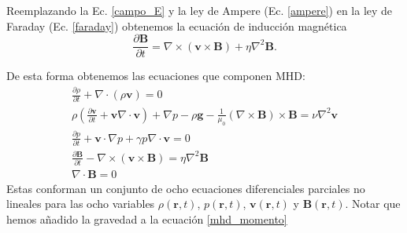\documentclass[a4paper,11pt]{report}
\begin{document}
Reemplazando la Ec. \ref{campo_E} y la ley de Ampere (Ec. \ref{ampere}) en la ley de Faraday (Ec. \ref{faraday}) obtenemos la ecuación de inducción magnética
\begin{equation}
\frac{\partial \boldsymbol{B}}{\partial t} = \nabla \times (\boldsymbol{v} \times \boldsymbol{B}) + \eta \nabla^2 \boldsymbol{B}. \label{induccion}
\end{equation}



De esta forma obtenemos las ecuaciones que componen MHD:
\begin{eqnarray}
\frac{\partial \rho}{\partial t} +\nabla \cdot (\rho \boldsymbol{v}) = 0 \label{conserv_densidad} \\
\rho \left( \frac{\partial\boldsymbol{v}}{\partial t} + \boldsymbol{v} \nabla \cdot \boldsymbol{v}\right) +\nabla p - \rho \boldsymbol{g} -\frac{1}{\mu_0}(\nabla \times \boldsymbol{B}) \times \boldsymbol{B} =\nu \nabla^2\boldsymbol{v} \label{mhd_momento} \\
\frac{\partial p}{\partial t} + \boldsymbol{v} \cdot \nabla p + \gamma p \nabla \cdot \boldsymbol{v} = 0 \label{presion}\\
\frac{\partial \boldsymbol{B}}{\partial t} - \nabla \times (\boldsymbol{v} \times \boldsymbol{B}) = \eta \nabla^2 \boldsymbol{B} \label{mhd_B} \\
\nabla \cdot \boldsymbol{B} = 0 
\end{eqnarray}
Estas conforman un conjunto de ocho ecuaciones diferenciales parciales no lineales para las ocho variables $\rho(\boldsymbol{r},t)$, $p(\boldsymbol{r},t)$, $\boldsymbol{v}(\boldsymbol{r},t)$ y $\boldsymbol{B}(\boldsymbol{r},t)$. Notar que hemos añadido la gravedad a la ecuación \ref{mhd_momento}
\end{document}
